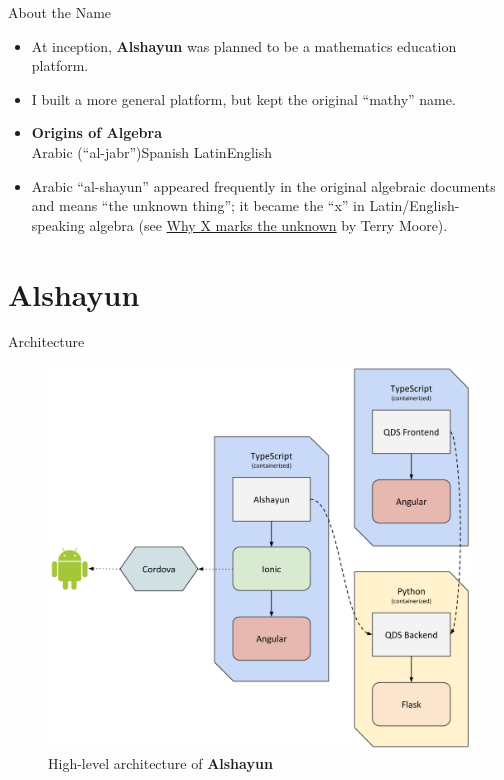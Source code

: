 \documentclass{beamer}
\begin{document}
\begin{frame}{About the Name}
    \begin{itemize}
        \item At inception, \textbf{Alshayun} was planned to be a mathematics
            education platform.
        \item I built a more general platform, but kept the original ``mathy'' name.
        \item
            \begin{center}
                \textbf{Origins of Algebra} \\
                Arabic (``al-jabr'')\textrightarrow Spanish\textrightarrow
                Latin\textrightarrow English
            \end{center}
        \item Arabic ``al-shayun'' appeared frequently in the original algebraic
            documents and means ``the unknown thing''; it became the ``x'' in
            Latin/English-speaking algebra (see
            \href{https://cosmosmagazine.com/mathematics/why-x-marks-unknown-0}{Why
            X marks the unknown} by Terry Moore).
    \end{itemize}
\end{frame}

\section{Alshayun}

\begin{frame}{Architecture}
    \begin{figure}
        \begin{center}
            \includegraphics[scale=0.2]{images/arch.png}
        \end{center}
        \caption{High-level architecture of \textbf{Alshayun}}
    \end{figure}
\end{frame}
\end{document}
